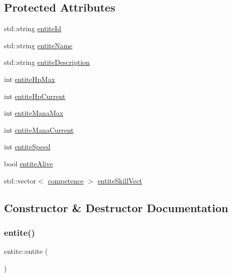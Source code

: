 \subsection*{Protected Attributes}
\begin{DoxyCompactItemize}
\item 
std\+::string \hyperlink{classentite_a904e8783de9fe2fc4306bf6b7822d025}{entite\+Id}
\item 
std\+::string \hyperlink{classentite_abe631a515b1cd0866dcfb078c4ceb07a}{entite\+Name}
\item 
std\+::string \hyperlink{classentite_a6fab1d9a04ade2cb97ec0904b12c82c9}{entite\+Description}
\item 
int \hyperlink{classentite_a754557f56c1c1fcbcbd40eec68b60f65}{entite\+Hp\+Max}
\item 
int \hyperlink{classentite_a09661bc80d898530a760153f6b690070}{entite\+Hp\+Current}
\item 
int \hyperlink{classentite_a696167d32c27b3b2a2fa6b473a888b18}{entite\+Mana\+Max}
\item 
int \hyperlink{classentite_ae194ea6eb360db3882fc0559a144899b}{entite\+Mana\+Current}
\item 
int \hyperlink{classentite_ad9df70a9bb07f07b3ebf520941c3a35f}{entite\+Speed}
\item 
bool \hyperlink{classentite_a5a69c21a4435817f2d960e0811d4474e}{entite\+Alive}
\item 
std\+::vector$<$ \hyperlink{classcompetence}{competence} $>$ \hyperlink{classentite_ad9d38b74abc49ec4fba0fcb27f4edaa9}{entite\+Skill\+Vect}
\end{DoxyCompactItemize}


\subsection{Constructor \& Destructor Documentation}
\mbox{\label{classentite_a41b83303ba28a228fdfad7de3eed40fe}} 
\subsubsection{\texorpdfstring{entite()}{entite()}\hspace{0.1cm}{\footnotesize\ttfamily [1/2]}}
{\footnotesize\ttfamily entite\+::entite (\begin{DoxyParamCaption}{ }\end{DoxyParamCaption})}



